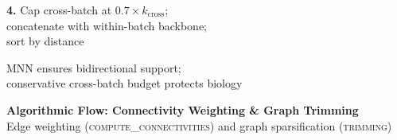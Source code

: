 \documentclass[8pt]{article}
\newlength{\colw}
\begin{document}
\begin{minipage}[t]{\colw}
\begin{stepbox}
\textbf{4.} Cap cross-batch at $0.7 \times k_\text{cross}$;\\
concatenate with within-batch backbone;\\
sort by distance
\end{stepbox}

\vspace{4pt}
\begin{center}
{\scriptsize\color{black!50} MNN ensures bidirectional support;\\
conservative cross-batch budget protects biology}
\end{center}
\end{minipage}

\newpage
\setlength{\colw}{0.48\textwidth}

\begin{center}
{\large\bfseries Algorithmic Flow: Connectivity Weighting \& Graph Trimming}\\[1pt]
{\scriptsize Edge weighting (\textsc{compute\_connectivities}) and graph sparsification (\textsc{trimming})}
\end{center}
\vspace{2pt}
\end{document}
